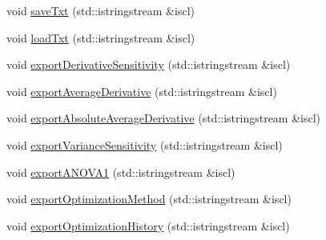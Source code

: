\begin{DoxyCompactItemize}
\item 
void \hyperlink{class_go_s_u_m_1_1_c_script_a1104a6eab4ac6a0cae2426586ace7803}{save\-Txt} (std\-::istringstream \&iscl)
\item 
void \hyperlink{class_go_s_u_m_1_1_c_script_a99f6957ea98fb4f9046a98a3a454b086}{load\-Txt} (std\-::istringstream \&iscl)
\item 
void \hyperlink{class_go_s_u_m_1_1_c_script_a99e5b53e8cb234a5860e45b6980d773e}{export\-Derivative\-Sensitivity} (std\-::istringstream \&iscl)
\item 
void \hyperlink{class_go_s_u_m_1_1_c_script_ab3d45d784bc5b3ebe29f05e95146d52f}{export\-Average\-Derivative} (std\-::istringstream \&iscl)
\item 
void \hyperlink{class_go_s_u_m_1_1_c_script_a5026f7d43cca7545adb02ed1506cc9ed}{export\-Absolute\-Average\-Derivative} (std\-::istringstream \&iscl)
\item 
void \hyperlink{class_go_s_u_m_1_1_c_script_ade71c2f6bf6d8b695227825b0f67f6f1}{export\-Variance\-Sensitivity} (std\-::istringstream \&iscl)
\item 
void \hyperlink{class_go_s_u_m_1_1_c_script_a3835177aa9da931873ad15d762ee7dfc}{export\-A\-N\-O\-V\-A1} (std\-::istringstream \&iscl)
\item 
void \hyperlink{class_go_s_u_m_1_1_c_script_a55e32e5c439dfaf7a0a5017fcb081c35}{export\-Optimization\-Method} (std\-::istringstream \&iscl)
\item 
void \hyperlink{class_go_s_u_m_1_1_c_script_a6e2fc8daf94de0f968dee9f27cd0f03f}{export\-Optimization\-History} (std\-::istringstream \&iscl)
\end{DoxyCompactItemize}
